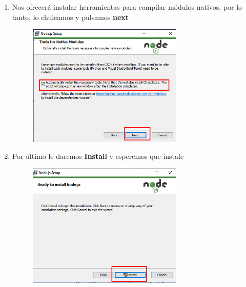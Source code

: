 \begin{enumerate}
    \item Nos ofrecerá instalar herramientas para compilar módulos nativos, por lo tanto, lo chuleamos y pulsamos \textbf{next }
    \begin{figure}[H]
        \centering
        \includegraphics[width=0.7\textwidth]{img/node6.png}
    \end{figure}
    \newpage
    \item Por último le daremos \textbf{Install} y esperemos que instale 
    \begin{figure}[H]
        \centering
        \includegraphics[width=0.7\textwidth]{img/node7.png}
    \end{figure}
    

\end{enumerate}
